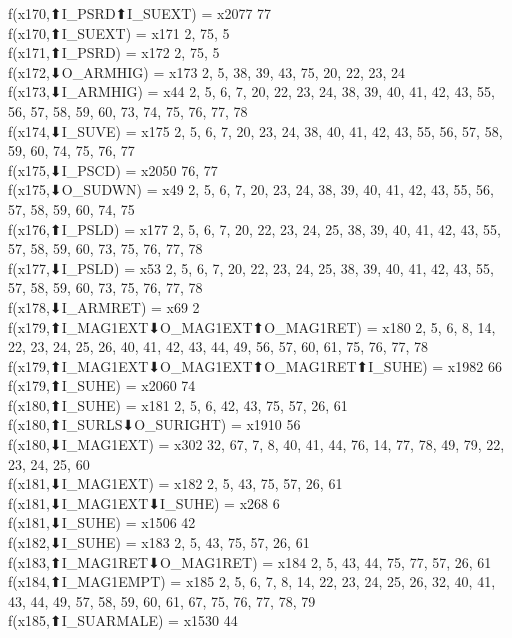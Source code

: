 f(x170,⬆I_PSRD⬆I_SUEXT) = x2077 {77} \\
f(x170,⬆I_SUEXT) = x171 {2, 75, 5} \\
f(x171,⬆I_PSRD) = x172 {2, 75, 5} \\
f(x172,⬇O_ARMHIG) = x173 {2, 5, 38, 39, 43, 75, 20, 22, 23, 24} \\
f(x173,⬇I_ARMHIG) = x44 {2, 5, 6, 7, 20, 22, 23, 24, 38, 39, 40, 41, 42, 43, 55, 56, 57, 58, 59, 60, 73, 74, 75, 76, 77, 78} \\
f(x174,⬇I_SUVE) = x175 {2, 5, 6, 7, 20, 23, 24, 38, 40, 41, 42, 43, 55, 56, 57, 58, 59, 60, 74, 75, 76, 77} \\
f(x175,⬇I_PSCD) = x2050 {76, 77} \\
f(x175,⬇O_SUDWN) = x49 {2, 5, 6, 7, 20, 23, 24, 38, 39, 40, 41, 42, 43, 55, 56, 57, 58, 59, 60, 74, 75} \\
f(x176,⬆I_PSLD) = x177 {2, 5, 6, 7, 20, 22, 23, 24, 25, 38, 39, 40, 41, 42, 43, 55, 57, 58, 59, 60, 73, 75, 76, 77, 78} \\
f(x177,⬇I_PSLD) = x53 {2, 5, 6, 7, 20, 22, 23, 24, 25, 38, 39, 40, 41, 42, 43, 55, 57, 58, 59, 60, 73, 75, 76, 77, 78} \\
f(x178,⬇I_ARMRET) = x69 {2} \\
f(x179,⬆I_MAG1EXT⬇O_MAG1EXT⬆O_MAG1RET) = x180 {2, 5, 6, 8, 14, 22, 23, 24, 25, 26, 40, 41, 42, 43, 44, 49, 56, 57, 60, 61, 75, 76, 77, 78} \\
f(x179,⬆I_MAG1EXT⬇O_MAG1EXT⬆O_MAG1RET⬆I_SUHE) = x1982 {66} \\
f(x179,⬆I_SUHE) = x2060 {74} \\
f(x180,⬆I_SUHE) = x181 {2, 5, 6, 42, 43, 75, 57, 26, 61} \\
f(x180,⬆I_SURLS⬇O_SURIGHT) = x1910 {56} \\
f(x180,⬇I_MAG1EXT) = x302 {32, 67, 7, 8, 40, 41, 44, 76, 14, 77, 78, 49, 79, 22, 23, 24, 25, 60} \\
f(x181,⬇I_MAG1EXT) = x182 {2, 5, 43, 75, 57, 26, 61} \\
f(x181,⬇I_MAG1EXT⬇I_SUHE) = x268 {6} \\
f(x181,⬇I_SUHE) = x1506 {42} \\
f(x182,⬇I_SUHE) = x183 {2, 5, 43, 75, 57, 26, 61} \\
f(x183,⬆I_MAG1RET⬇O_MAG1RET) = x184 {2, 5, 43, 44, 75, 77, 57, 26, 61} \\
f(x184,⬆I_MAG1EMPT) = x185 {2, 5, 6, 7, 8, 14, 22, 23, 24, 25, 26, 32, 40, 41, 43, 44, 49, 57, 58, 59, 60, 61, 67, 75, 76, 77, 78, 79} \\
f(x185,⬆I_SUARMALE) = x1530 {44} \\
